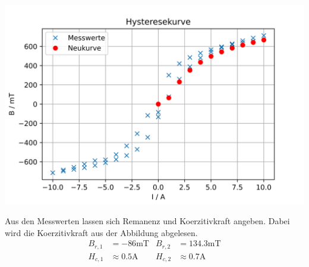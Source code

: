\includegraphics[width=\textwidth]{pictures/HysteresekurveGemessen.png}    %

Aus den Messwerten lassen sich Remanenz und Koerzitivkraft angeben.
Dabei wird die Koerzitivkraft aus der Abbildung abgelesen.
\begin{align*}
  B_{r,1} &= -86 \unit{\milli\tesla} &  B_{r,2} &= 134.3 \unit{\milli\tesla} \\
  H_{c,1} &\approx 0.5 \unit{\ampere} & H_{c,2} &\approx 0.7\unit{\ampere}
\end{align*}